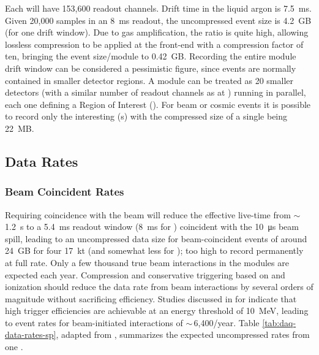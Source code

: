 Each  will have 153,600 readout channels. Drift time in the liquid argon is \SI{7.5}{ms}. Given 20,000 samples in an \SI{8}{ms} readout, the uncompressed event size is \SI{4.2}{GB} (for one drift window).  Due to gas amplification, the  ratio is quite high, allowing lossless compression to be applied at the front-end  with a compression factor of ten, bringing the event size/module to \SI{.42}{GB}. Recording the entire module drift window can be considered a pessimistic figure,  since events are normally contained in smaller detector regions. A   module can be treated as 20 smaller  detectors (with a similar number  of readout channels as  %
at ) running in parallel, each one defining a Region of Interest  (). For beam or cosmic events it is possible to record only the interesting (s) with the compressed size of a single  being \SI{22}{MB}.

\subsection{Data Rates}
\subsubsection{Beam Coincident Rates}

Requiring  coincidence with the  beam will reduce the effective live-time from $\sim\,$\SI{1.2}{s}  to a \SI{5.4}{ms}  readout window (\SI{8}{ms} for ) coincident with the \SI{10}{\micro\second} beam spill, leading to an uncompressed data size for beam-coincident events of around \SI{24}{GB} for four \SI{17}{kt}  (and somewhat less for ); too high to record permanently at full rate.
Only a few thousand true beam interactions in the  modules are expected each year.  Compression and conservative triggering based on  and ionization should reduce the data rate from beam interactions by several orders of magnitude without sacrificing efficiency.  Studies discussed in %
\spchdaq{} for  
indicate that high trigger efficiencies are achievable at an energy threshold of \SI{10}{MeV}, leading to event rates for beam-initiated  interactions of $\sim\,$6,400/year.
Table \ref{tab:daq-data-rates-sp}, adapted from \spchdaq{}, %
 summarizes the expected uncompressed rates from one . 

